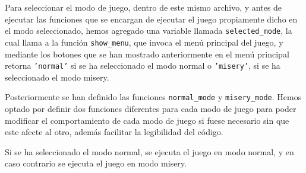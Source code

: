 \documentclass[a4paper,12pt]{article}
\begin{document}
\vspace{\baselineskip}
Para seleccionar el modo de juego, dentro de este mismo archivo, y antes de ejecutar las funciones que se encargan de ejecutar el juego propiamente dicho en el modo seleccionado,
hemos agregado una variable llamada \texttt{selected\_mode}, la cual llama a la función \texttt{show\_menu}, que invoca el menú principal del juego, y mediante los botones que se 
han mostrado anteriormente en el menú principal retorna \texttt{'normal'} si se ha seleccionado el modo normal o \texttt{'misery'}, si se ha seleccionado el modo misery.

\vspace{\baselineskip}
Posteriormente se han definido las funciones \texttt{normal\_mode} y \texttt{misery\_mode}. Hemos optado por definir dos funciones diferentes para cada modo de juego para poder 
modificar el comportamiento de cada modo de juego si fuese necesario sin que este afecte al otro, además facilitar la legibilidad del código.

Si se ha seleccionado el modo normal, se ejecuta el juego en modo normal, y en caso contrario se ejecuta el juego en modo misery.
\end{document}
